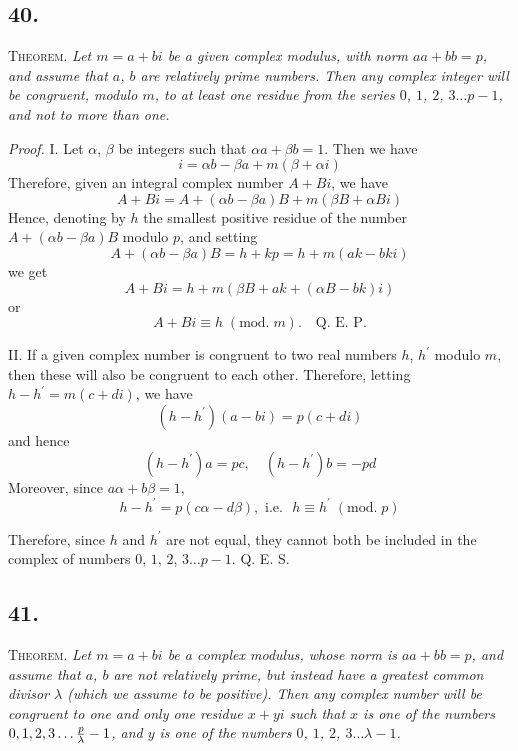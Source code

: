 \documentclass[twoside,12pt]{memoir}
\renewcommand{\pmod}[1]{\;(\textrm{mod.}\;#1)}
\let\oldfrac\frac
\def\frac#1#2{\mathchoice{\tfrac{#1}{#2}}{\oldfrac{#1}{#2}}{\genfrac{}{}{}{2}{#1}{#2\mathstrut}}{\genfrac{}{}{}{3}{#1}{#2\mathstrut}}}
\begin{document}
\subsection*{40.}
 
\textsc{Theorem.} \textit{Let \(m=a+b i\) be a given complex modulus, with norm \(a a+b b=p\), and assume that \(a\), \(b\) are relatively prime numbers.  Then any complex integer will be congruent, modulo \(m\), to at least one residue from the series \(0\), \(1\), \(2\), \(3 \ldots p-1\), and not to more than one.}\pagebreak%
 
\textit{Proof.} I. Let \(\alpha\), \(\beta\) be integers such that \(\alpha a+\beta b=1\). Then we have
\[i=\alpha b-\beta a+m(\beta+\alpha i)\]
Therefore, given an integral complex number \(A+B i\), we have
\[A+B i=A+(\alpha b-\beta a) B+m(\beta B+\alpha B i)\]
Hence, denoting by \(h\) the smallest positive residue of the number \(A+(\alpha b-\beta a) B\) modulo \(p\), and setting
\[A+(\alpha b-\beta a) B=h+k p=h+m(a k-b k i)\]
we get
\[A+B i=h+m(\beta B+a k+(\alpha B-b k) i)\]
or
\[A+B i \equiv h\pmod{m} . \quad \text{Q. E. P.}\]
 
II. If a given complex number is congruent to two real numbers \(h\), \(h^{\prime}\) modulo \(m\), then these will also be congruent to each other. Therefore, letting \(h-h^{\prime}=m(c+d i)\), we have
\[(h-h^{\prime})(a-b i)=p(c+d i)\]
and hence
\[(h-h^{\prime}) a=p c, \quad (h-h^{\prime}) b=-p d\]
Moreover, since \(a \alpha+b \beta=1\),
\[h-h^{\prime}=p(c \alpha-d \beta), \text{ i{.}e{.} } h \equiv h^{\prime}\pmod{p}\]
 
Therefore, since \(h\) and \(h^{\prime}\) are not equal, they cannot both be included in the complex of numbers \(0\), \(1\), \(2\), \(3 \ldots p-1\). Q. E. S.

\subsection*{41.}

\textsc{Theorem.} \textit{Let \(m=a+b i\) be a complex modulus, whose norm is \(a a+b b=p\), and assume that \(a\), \(b\) are not relatively prime, but instead have a greatest common divisor \(\lambda\) (which we assume to be positive).  Then any complex number will be congruent to one and only one residue \(x+y i\) such that \(x\) is one of the numbers \(0,1,2,3 \ldots \frac{p}{\lambda}-1\), and \(y\) is one of the numbers \(0\), \(1\), \(2\), \(3 \ldots \lambda-1\).}\pagebreak%
\end{document}

